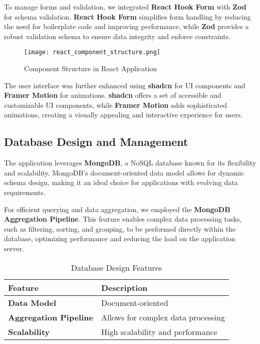 To manage forms and validation, we integrated \textbf{React Hook Form} with \textbf{Zod} for schema validation. \textbf{React Hook Form} simplifies form handling by reducing the need for boilerplate code and improving performance, while \textbf{Zod} provides a robust validation schema to ensure data integrity and enforce constraints. 

\begin{figure}[h]
\centering
\texttt{[image: react\_component\_structure.png]}
\caption{Component Structure in React Application}
\label{fig:react_components}
\end{figure}

The user interface was further enhanced using \textbf{shadcn} for UI components and \textbf{Framer Motion} for animations. \textbf{shadcn} offers a set of accessible and customizable UI components, while \textbf{Framer Motion} adds sophisticated animations, creating a visually appealing and interactive experience for users.

\subsection{Database Design and Management}

The application leverages \textbf{MongoDB}, a NoSQL database known for its flexibility and scalability. MongoDB's document-oriented data model allows for dynamic schema design, making it an ideal choice for applications with evolving data requirements.

For efficient querying and data aggregation, we employed the \textbf{MongoDB Aggregation Pipeline}. This feature enables complex data processing tasks, such as filtering, sorting, and grouping, to be performed directly within the database, optimizing performance and reducing the load on the application server.

\begin{table}[h]
\centering
\begin{tabular}{|l|l|}
\hline
\textbf{Feature} & \textbf{Description} \\
\hline
\textbf{Data Model} & Document-oriented \\
\textbf{Aggregation Pipeline} & Allows for complex data processing \\
\textbf{Scalability} & High scalability and performance \\
\hline
\end{tabular}
\caption{Database Design Features}
\label{tab:database_features}
\end{table}

